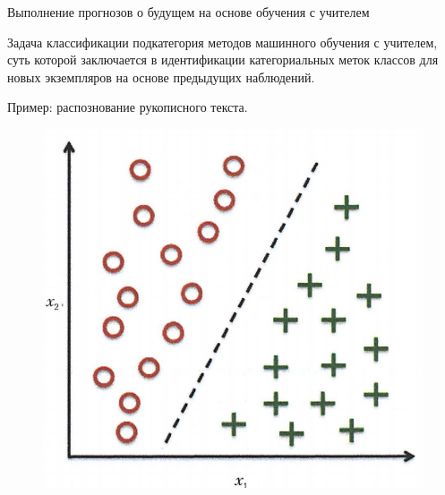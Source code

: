 \documentclass{beamer}
\begin{document}
\begin{frame}[t]{Выполнение прогнозов о будущем на основе обучения с учителем}
\begin{block}{Задача классификации}
подкатегория методов машинного обучения с учителем, суть которой заключается в идентификации категориальных меток классов для новых экземпляров на основе предыдущих наблюдений.
\end{block}
Пример: распознование рукописного текста.
\begin{figure}[h]
\centering
\includegraphics[scale=0.25]{images/lec01-pic05.png}
\end{figure}
\end{frame}
\end{document}
